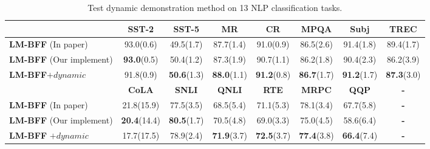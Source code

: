 \begin{table}[th]
	\centering
	\small
	\begin{tabular}{l|ccccccc}
		\toprule
		 & \textbf{SST-2} & \textbf{SST-5} & \textbf{MR} & \textbf{CR} & \textbf{MPQA} & \textbf{Subj} & \textbf{TREC} \\
		\midrule
		\textbf{LM-BFF} (In paper)  & 93.0(0.6) & 49.5(1.7) & 87.7(1.4) & 91.0(0.9) & 86.5(2.6) & 91.4(1.8) & 89.4(1.7) \\
		\midrule 
		\textbf{LM-BFF} (Our implement)   & \textbf{93.0}(0.5) & 50.4(1.2) & 87.3(1.9) & 90.7(1.1) & 86.2(1.8) & 90.4(2.3) & 86.2(3.9)\\
		\textbf{LM-BFF}$+dynamic$ & 91.8(0.9) & \textbf{50.6}(1.3)& \textbf{88.0}(1.1) & \textbf{91.2}(0.8) & \textbf{86.7}(1.7) & \textbf{91.2}(1.7) & \textbf{87.3}(3.0) \\
		\midrule 
		 & \textbf{CoLA} & \textbf{SNLI} & \textbf{QNLI} & \textbf{RTE} & \textbf{MRPC} & \textbf{QQP} & \textbf{-}\\
		\midrule 
		\textbf{LM-BFF} (In paper)  & 21.8(15.9) & 77.5(3.5) & 68.5(5.4) & 71.1(5.3) & 78.1(3.4) & 67.7(5.8) &\textbf{-}\\
		\midrule 
		\textbf{LM-BFF} (Our implement)   & \textbf{20.4}(14.4)& \textbf{80.5}(1.7)& 70.5(4.8) & 69.0(3.3) & 75.0(4.5) &58.6(6.4)&\textbf{-}\\
		\textbf{LM-BFF} $+ dynamic$ & 17.7(17.5) & 78.9(2.4) & \textbf{71.9}(3.7) & \textbf{72.5}(3.7) & \textbf{77.4}(3.8) & \textbf{66.4}(7.4) &\textbf{-}\\
		\bottomrule
	\end{tabular}
	\caption{Test dynamic demonstration method on 13 NLP classification tasks. }
	\label{table:generazation}
\end{table}

